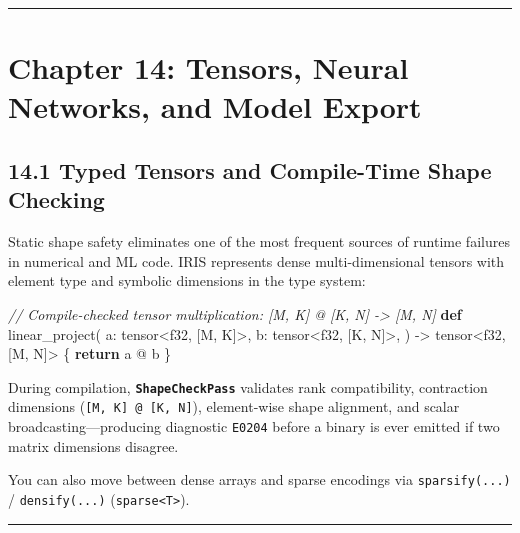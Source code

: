 \documentclass[
  english,
  oneside]{book}
\newenvironment{Shaded}{\begin{snugshade}}{\end{snugshade}}
\newcommand{\CommentTok}[1]{\textcolor[rgb]{0.42,0.60,0.33}{\textit{#1}}}
\newcommand{\ControlFlowTok}[1]{\textcolor[rgb]{0.77,0.53,0.75}{\textbf{#1}}}
\newcommand{\DataTypeTok}[1]{\textcolor[rgb]{0.31,0.79,0.69}{#1}}
\newcommand{\KeywordTok}[1]{\textcolor[rgb]{0.34,0.61,0.84}{\textbf{#1}}}
\newcommand{\NormalTok}[1]{\textcolor[rgb]{0.83,0.83,0.83}{#1}}
\newcommand{\OperatorTok}[1]{\textcolor[rgb]{0.83,0.83,0.83}{#1}}
\begin{document}
\begin{center}\rule{0.5\linewidth}{0.5pt}\end{center}

\chapter{Chapter 14: Tensors, Neural Networks, and Model
Export}\label{chapter-14-tensors-neural-networks-and-model-export}

\section{14.1 Typed Tensors and Compile-Time Shape
Checking}\label{typed-tensors-and-compile-time-shape-checking}

Static shape safety eliminates one of the most frequent sources of
runtime failures in numerical and ML code. IRIS represents dense
multi-dimensional tensors with element type and symbolic dimensions in
the type system:

\begin{Shaded}
\begin{Highlighting}[]
\CommentTok{// Compile{-}checked tensor multiplication: [M, K] @ [K, N] {-}\textgreater{} [M, N]}
\KeywordTok{def}\NormalTok{ linear\_project(}
\NormalTok{    a: }\DataTypeTok{tensor}\OperatorTok{\textless{}}\DataTypeTok{f32}\NormalTok{, [M, K]}\OperatorTok{\textgreater{}}\NormalTok{,}
\NormalTok{    b: }\DataTypeTok{tensor}\OperatorTok{\textless{}}\DataTypeTok{f32}\NormalTok{, [K, N]}\OperatorTok{\textgreater{}}\NormalTok{,}
\NormalTok{) }\OperatorTok{{-}\textgreater{}} \DataTypeTok{tensor}\OperatorTok{\textless{}}\DataTypeTok{f32}\NormalTok{, [M, N]}\OperatorTok{\textgreater{}}\NormalTok{ \{}
    \ControlFlowTok{return}\NormalTok{ a @ b}
\NormalTok{\}}
\end{Highlighting}
\end{Shaded}

During compilation, \textbf{\texttt{ShapeCheckPass}} validates rank
compatibility, contraction dimensions
(\texttt{{[}M,\ K{]}\ @\ {[}K,\ N{]}}), element-wise shape alignment,
and scalar broadcasting---producing diagnostic \texttt{E0204} before a
binary is ever emitted if two matrix dimensions disagree.

You can also move between dense arrays and sparse encodings via
\texttt{sparsify(...)} / \texttt{densify(...)}
(\texttt{sparse\textless{}T\textgreater{}}).

\begin{center}\rule{0.5\linewidth}{0.5pt}\end{center}
\end{document}
